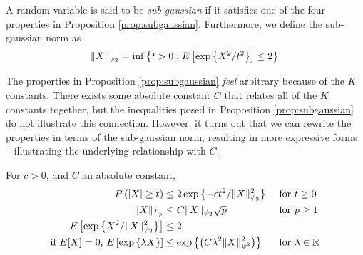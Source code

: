 \begin{tcolorbox}
\begin{definition}
A random variable is said to be \textit{sub-gaussian} if it satisfies one of the four properties in Proposition \ref{prop:subgaussian}. Furthermore, we define the sub-gaussian norm as 
    \begin{equation}
    \|X\|_{\psi_2} = \inf\left\{ t>0: E\left[\exp\left\{X^2/t^2 \right\} \right] \leq 2 \right\} \\
    \end{equation}
\end{definition}
\end{tcolorbox}

The properties in Proposition \ref{prop:subgaussian} \textit{feel} arbitrary because of the $K$ constants. There exists some absolute constant $C$ that relates all of the $K$ constants together, but the inequalities posed in Proposition \ref{prop:subgaussian} do not illustrate this connection. However, it turns out that we can rewrite the properties in terms of the sub-gaussian norm, resulting in more expressive forms -- illustrating the underlying relationship with $C$: \\ 

\begin{tcolorbox}[colback=white!90!gray, title=Proposition \ref{prop:subgaussian} With Sub-Gaussian Norm]
For $c>0$, and $C$ an absolute constant, 
    \begin{align}
    P\left(|X| \geq t \right) &\leq 2 \exp\left\{-ct^2 / \|X\|^2_{\psi_2} \right\} &&\text{ for $t\geq 0$} \\ 
    \|X\|_{L_p} &\leq C \|X\|_{\psi_2} \sqrt{p} &&\text{ for $p \geq 1$} \\ 
    E\left[\exp\left\{X^2 / \|X\|^2_{\psi_2} \right\} \right] &\leq 2  \\ 
    \text{if $E[X]=0$, } E\left[\exp\left\{\lambda X \right\} \right] &\leq \exp\left\{\left(C \lambda^2 \|X\|_{\psi^2}^{2} \right) \right\} && \text{ for $\lambda \in \mathbb{R}$}
    \end{align}
\end{tcolorbox}

